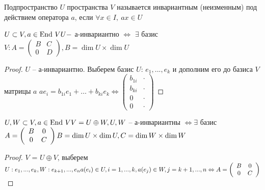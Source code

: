 
\begin{Def}
	Подпространство $U$ пространства $V$ называется инвариантным (неизменным) под действием оператора $a$, если 
	$\forall x \in I, \ ax \in U$
\end{Def}

\begin{Lm}
	$U \subset V, a \in \operatorname{End} \, V\\
	U -$ а-инвариантно $\Leftrightarrow$ $\exists$ базис $V: A = 
	\left(\begin{array}{cc}
		B & C\\
		0 & D
		\end{array}\right), B = \dim U \times \dim U$
\end{Lm}

\begin{proof}
	$U$ -- а-инвариантно. Выберем базис $U$: $e_1, ... , e_k$ и дополним его до базиса $V$ матрицы $a$
	$ae_i = b_{1i}e_1+\dots+b_{ki}e_k \Leftrightarrow \left(\begin{array}{cc}
		b_{1i} & \cdot\\
		b_{ki} & \cdot\\
		0 & \cdot \\
		0 & \cdot
	\end{array}
	\right)$
\end{proof}

\begin{Lm}
	$U, W \subset V, a \in \operatorname{End} \, V\\
	V = U \oplus W, U, W$ -- а-инвариантны $\Leftrightarrow \exists$ базис $A = \left(\begin{array}{cc}
		B & 0\\
		0 & C
	\end{array}\right)\\
	B = \dim U \times \dim U, C = \dim W \times \dim W$
\end{Lm}

\begin{proof}
	$V$ = $U \oplus V$, выберем $U: e_1, ..., e_k, W: e_{k+1}, ..., e_n\\
	a(e_i) \in U, i = 1, ..., k, a(e_j) \in W, j = k+1, ..., n \Leftrightarrow A = \left(\begin{array}{cc}
		B & 0\\
		0 & C
	\end{array}\right)$
\end{proof}

